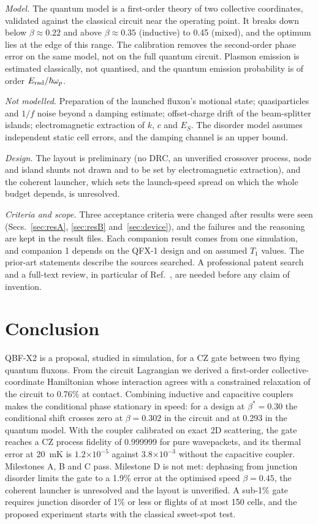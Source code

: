 \documentclass[10pt,twocolumn,letterpaper]{article}
\newcommand{\ee}[1]{\ensuremath{\times10^{#1}}}
\begin{document}
\emph{Model.} The quantum model is a first-order theory of two collective coordinates, validated against the classical
circuit near the operating point. It breaks down below $\beta\approx0.22$ and above $\beta\approx0.35$ (inductive) to
0.45 (mixed), and the optimum lies at the edge of this range. The calibration removes the second-order phase error on
the same model, not on the full quantum circuit. Plasmon emission is estimated classically, not quantised, and the
quantum emission probability is of order $E_{\rm rad}/\hbar\omega_p$.

\emph{Not modelled.} Preparation of the launched fluxon's motional state; quasiparticles and $1/f$ noise beyond a
damping estimate; offset-charge drift of the beam-splitter islands; electromagnetic extraction of $k$, $c$ and $E_S$.
The disorder model assumes independent static cell errors, and the damping channel is an upper bound.

\emph{Design.} The layout is preliminary (no DRC, an unverified crossover process, node and island shunts not drawn
and to be set by electromagnetic extraction), and the coherent launcher, which sets the launch-speed spread on which the
whole budget depends, is unresolved.

\emph{Criteria and scope.} Three acceptance criteria were changed after results were seen (Secs.~\ref{sec:resA},
\ref{sec:resB} and~\ref{sec:device}), and the failures and the reasoning are kept in the result files. Each companion
result comes from one simulation, and companion 1 depends on the QFX-1 design and on assumed $T_1$ values. The
prior-art statements describe the sources searched. A professional patent search and a full-text review, in particular
of Ref.~\cite{Fujii2007}, are needed before any claim of invention.

\section{Conclusion}
\label{sec:conclusion}

QBF-X2 is a proposal, studied in simulation, for a CZ gate between two flying quantum fluxons. From the circuit
Lagrangian we derived a first-order collective-coordinate Hamiltonian whose interaction agrees with a constrained
relaxation of the circuit to 0.76\% at contact. Combining inductive and capacitive couplers makes the conditional phase
stationary in speed: for a design at $\beta^*=0.30$ the conditional shift crosses zero at $\beta=0.302$ in the circuit
and at 0.293 in the quantum model. With the coupler calibrated on exact 2D scattering, the gate reaches a CZ process
fidelity of 0.999999 for pure wavepackets, and its thermal error at 20~mK is $1.2\ee{-5}$ against $3.8\ee{-3}$ without
the capacitive coupler. Milestones A, B and C pass. Milestone D is not met: dephasing from junction disorder limits the
gate to a 1.9\% error at the optimised speed $\beta=0.45$, the coherent launcher is unresolved and the layout is
unverified. A sub-1\% gate requires junction disorder of 1\% or less or flights of at most 150 cells, and the proposed
experiment starts with the classical sweet-spot test.
\end{document}
